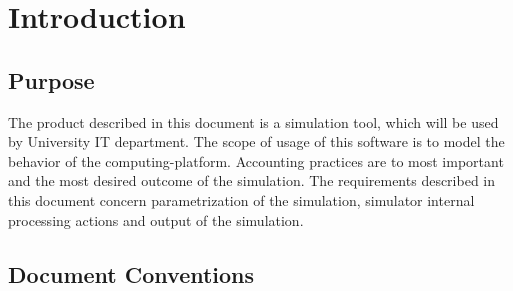 
\chapter{Introduction}

\section{Purpose}
	\begin{comment}
	$<$Identify the product whose software requirements are specified in this 
	document, including the revision or release number. Describe the scope of the 
	product that is covered by this SRS, particularly if this SRS describes only 
	part of the system or a single subsystem.$>$
	\end{comment}
	The product described in this document is a simulation tool, which will be used by University IT department. The scope of usage of this software is to model the behavior of the \gls{computing-platform}. Accounting practices are to most important and the most desired outcome of the simulation. The requirements described in this document concern parametrization of the simulation, simulator internal processing actions and output of the simulation.
\section{Document Conventions}
	\begin{comment}
		$<$Describe any standards or typographical conventions that were followed when 
		writing this SRS, such as fonts or highlighting that have special significance.  
		For example, state whether priorities  for higher-level requirements are assumed 
		to be inherited by detailed requirements, or whether every requirement statement 
		is to have its own priority.$>$
	\end{comment}
	
